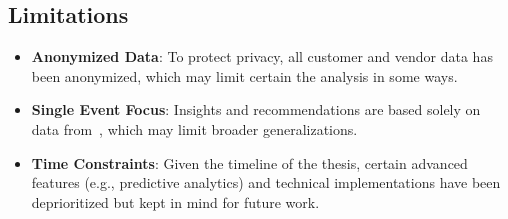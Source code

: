 \subsection*{Limitations}
\label{subsec:introduction-limitations}
\begin{itemize}
	\item \textbf{Anonymized Data}: To protect privacy, all customer and vendor data has been anonymized, which may limit certain the analysis in some ways.
	\item \textbf{Single Event Focus}: Insights and recommendations are based solely on data from~\theEvent, which may limit broader generalizations.
	\item \textbf{Time Constraints}: Given the timeline of the thesis, certain advanced features (e.g., predictive analytics) and technical implementations have been deprioritized but kept in mind for future work.
\end{itemize}
